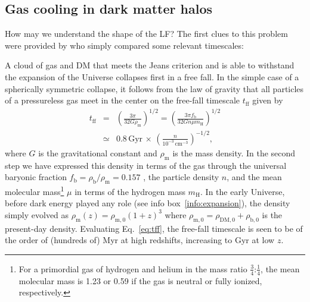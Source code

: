 \documentclass[useAMS]{aa}
\begin{document}
\subsection{Gas cooling in dark matter halos}
\label{sec:cooling}

How may we understand the shape of the LF? The first clues to this problem were provided by \citet{Rees1977} who simply compared some relevant timescales: 

A cloud of gas and DM that meets the Jeans criterion and is able to withstand the expansion of the Universe collapses first in a free fall.
In the simple case of a spherically symmetric collapse, it follows from the law of gravity that all particles of a pressureless gas meet in the center on the free-fall timescale $t_\mathrm{ff}$ given by
\begin{eqnarray}
    \label{eq:tff}
    t_\mathrm{ff} & = & \left( \frac{3\pi}{32 G \rho_\mathrm{m}} \right)^{1/2}
                    = \left( \frac{3\pi f_\mathrm{b}}{32 G n \mu m_\mathrm{H}} \right)^{1/2}\\
                  & \simeq & 0.8\,\mathrm{Gyr}\,\times\,\left(\frac{n}{10^{-3}\,\mathrm{cm}^{-3}}\right)^{-1/2},
\end{eqnarray}
where
$G$ is the gravitational constant and $\rho_\mathrm{m}$ is the mass density.
In the second step we have expressed this density in terms of the gas through the universal baryonic fraction $f_\mathrm{b} = \rho_\mathrm{b}/\rho_\mathrm{m} = 0.157$ \citep{PlanckCollaboration2020}, the particle density $n$, and the mean molecular mass\footnote{For a primordial gas of hydrogen and helium in the mass ratio $\frac{3}{4}$:$\frac{1}{4}$, the mean molecular mass is 1.23 or 0.59 if the gas is neutral or fully ionized, respectively.} $\mu$ in terms of the hydrogen mass $m_\mathrm{H}$.
In the early Universe, before dark energy played any role (see info box~\ref{info:expansion}), the density simply evolved as $\rho_\mathrm{m}(z) = \rho_\mathrm{m,0} (1+z)^3$ where $\rho_\mathrm{m,0} = \rho_\mathrm{DM,0} + \rho_\mathrm{b,0}$ is the present-day density.
Evaluating Eq.~\ref{eq:tff}, the free-fall timescale is seen to be of the order of (hundreds of) Myr at high redshifts, increasing to Gyr at low $z$.
\end{document}
